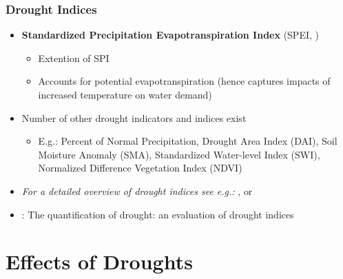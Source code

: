 \documentclass{beamer}              %
\begin{document}
\begin{frame}\label{Indices3}
\frametitle{Drought Indices} 

 \begin{itemize}
 \item \textbf{Standardized Precipitation Evapotranspiration Index} (SPEI, \citealp{SPEI})
\begin{itemize}
\item Extention of SPI
\item Accounts for potential evapotranspiration (hence captures impacts of increased temperature on water demand)
\end{itemize}
\item Number of other drought indicators and indices exist
\begin{itemize}
\item E.g.: Percent of Normal Precipitation, Drought Area Index (DAI), Soil Moisture Anomaly (SMA), Standardized Water-level Index (SWI), Normalized Difference Vegetation Index (NDVI)
\end{itemize}
\item  \textit{For a detailed overview of drought indices see e.g.:} \cite{monacelli2005}, \cite{svoboda2016} or \cite{zargar2011}

\item \cite{keyantash2002}: The quantification of drought: an evaluation of drought indices
\end{itemize} 


\end{frame}




\section{Effects of Droughts}
\end{document}
